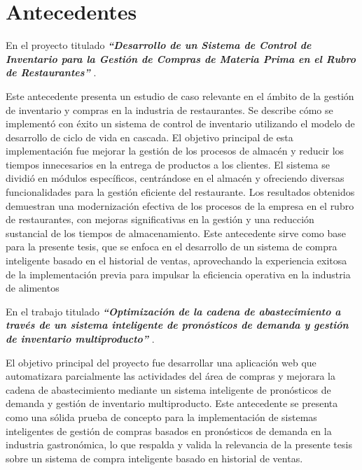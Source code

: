 \section{Antecedentes}
En el proyecto titulado \textbf{\textit{“Desarrollo de un Sistema de Control de Inventario para la Gestión de Compras de Materia Prima en el Rubro de Restaurantes”}} \cite{condorena2017desarrollo}. 

Este antecedente presenta un estudio de caso relevante en el ámbito de la gestión de inventario y compras en la industria de restaurantes. Se describe cómo se implementó con éxito un sistema de control de inventario utilizando el modelo de desarrollo de ciclo de vida en cascada. El objetivo principal de esta implementación fue mejorar la gestión de los procesos de almacén y reducir los tiempos innecesarios en la entrega de productos a los clientes. El sistema se dividió en módulos específicos, centrándose en el almacén y ofreciendo diversas funcionalidades para la gestión eficiente del restaurante. Los resultados obtenidos demuestran una modernización efectiva de los procesos de la empresa en el rubro de restaurantes, con mejoras significativas en la gestión y una reducción sustancial de los tiempos de almacenamiento. Este antecedente sirve como base para la presente tesis, que se enfoca en el desarrollo de un sistema de compra inteligente basado en el historial de ventas, aprovechando la experiencia exitosa de la implementación previa para impulsar la eficiencia operativa en la industria de alimentos



\vspace{1\baselineskip}
En el trabajo titulado \textbf{\textit{ “Optimización de la cadena de abastecimiento a través de un sistema inteligente de pronósticos de demanda y gestión de inventario multiproducto”}} \cite{pacheco2015rediseno}. 

El objetivo principal del proyecto fue desarrollar una aplicación web que automatizara parcialmente las actividades del área de compras y mejorara la cadena de abastecimiento mediante un sistema inteligente de pronósticos de demanda y gestión de inventario multiproducto. 
Este antecedente se presenta como una sólida prueba de concepto para la implementación de sistemas inteligentes de gestión de compras basados en pronósticos de demanda en la industria gastronómica, lo que respalda y valida la relevancia de la presente tesis sobre un sistema de compra inteligente basado en historial de ventas.


